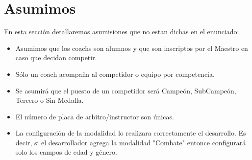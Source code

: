 \section{Asumimos}

En esta secci\'on detallaremos asumisiones que no estan dichas en el enunciado:

\begin{itemize}

\item Asumimos que los coachs son alumnos y que son inscriptos por el Maestro en caso que decidan competir.
\item S\'olo un coach acompaña al competidor o equipo por competencia.
\item Se asumirá que el puesto de un competidor será Campeón, SubCampeón, Tercero o Sin Medalla.
\item El n\'umero de placa de arbitro/instructor son \'unicas.
\item La configuraci\'on de la modalidad lo realizara correctamente el desarrollo. Es decir, si el desarrollador agrega la modalidad "Combate" entonce configurar\'a solo los campos de edad y g\'enero. 

\end{itemize}


